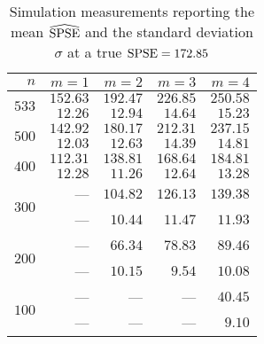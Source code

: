 \begin{table}[htb]
	\center
	\caption{Simulation measurements reporting the mean $\widehat{\mathrm{SPSE}}$ and the standard deviation $\sigma$ at a true $\mathrm{SPSE} = 172.85$}
	\label{tab:sim-res}
	\begin{tabular}{rrrrr}
		\hline
		$n$ & $m=1$ & $m=2$ & $m=3$ & $m=4$ \\
		\hline
		\hline
		\multirow{2}{*}{$533$}
		& $152.63$ & $192.47$ & $226.85$ & $250.58$ \\
		& $12.26$ & $12.94$ & $14.64$ & $15.23$ \\
		\hline
		\multirow{2}{*}{$500$}
		& $142.92$ & $180.17$ & $212.31$ & $237.15$ \\
		& $12.03$ & $12.63$ & $14.39$ & $14.81$ \\
		\hline
		\multirow{2}{*}{$400$}
		& $112.31$ & $138.81$ & $168.64$ & $184.81$ \\
		& $12.28$ & $11.26$ & $12.64$ & $13.28$ \\
		\hline
		\multirow{2}{*}{$300$}
		& --- & $104.82$ & $126.13$ & $139.38$ \\
		& --- & $10.44$ & $11.47$ & $11.93$ \\
		\hline
		\multirow{2}{*}{$200$}
		& --- & $66.34$ & $78.83$ & $89.46$ \\
		& --- & $10.15$ & $9.54$ & $10.08$ \\
		\hline
		\multirow{2}{*}{$100$}
		& --- & --- & --- & $40.45$ \\
		& --- & --- & --- & $9.10$ \\
		\hline
	\end{tabular}
\end{table}